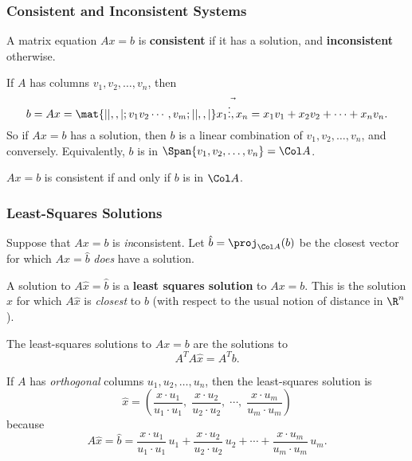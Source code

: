 
\begin{frame}
\frametitle{Consistent and Inconsistent Systems}

\vskip-3mm
\begin{defn}
  A matrix equation $Ax=b$ is \textbf{consistent} if it has a solution, and
  \textbf{inconsistent} otherwise.
\end{defn}

\pause\medskip
If $A$ has columns $v_1,v_2,\ldots,v_n$, then
\[ b = Ax = \mat{| | ,, |; v_1 v_2 \cdots, v_m; | | ,, |}\vec{x_1 \vdots, x_n}
= x_1v_1 + x_2v_2 + \cdots + x_nv_n. \]
\pause
So if $Ax=b$ has a solution, then $b$ is a linear combination of
$v_1,v_2,\ldots,v_n$, and conversely.
\pause
Equivalently, $b$ is in $\Span\{v_1,v_2,\ldots,v_n\} = \Col A$.


\pause\medskip
\begin{bluebox}[Important]{.7\linewidth}
  $Ax = b$ is consistent if and only if $b$ is in $\Col A$.
\end{bluebox}

\end{frame}



\begin{frame}
\frametitle{Least-Squares Solutions}

Suppose that $Ax=b$ is \emph{in\/}consistent.
\pause
Let $\hat b = \proj_{\Col A}(b)$ be the closest vector for which
$A\hat x=\hat b$ \emph{does} have a solution.

\pause\medskip
\begin{defn}
  A solution to $A\hat x = \hat b$ is a \textbf{least squares solution} 
  to $Ax=b$. 
  \pause
  This is the solution $\hat x$ for which $A\hat x$ is \emph{closest} to $b$
  (with respect to the usual notion of distance in $\R^n$).
\end{defn}

\pause\medskip
\begin{thm}
  The least-squares solutions to $Ax=b$ are the solutions to
  \[ A^TA\hat x = A^Tb. \]
\end{thm}

\pause\medskip
If $A$ has \emph{orthogonal} columns $u_1,u_2,\ldots,u_n$, then the
least-squares solution is
\displayskips{3pt}
\[ \hat x = \left( \frac{x\cdot u_1}{u_1\cdot u_1},\;
\frac{x\cdot u_2}{u_2\cdot u_2},\; \cdots,\;
\frac{x\cdot u_m}{u_m\cdot u_m} \right) \]
because
\[  A\hat x = \hat b = \frac{x\cdot u_1}{u_1\cdot u_1}\,u_1
+ \frac{x\cdot u_2}{u_2\cdot u_2}\,u_2 + \cdots
+ \frac{x\cdot u_m}{u_m\cdot u_m}\,u_m.
\]

\end{frame}


